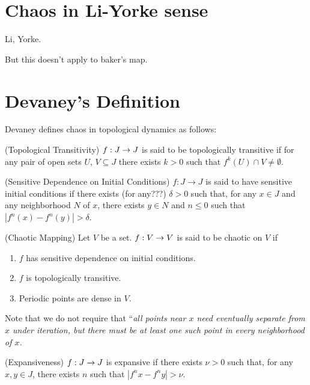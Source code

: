 \documentclass[11pt]{article}
\begin{document}
\section{Chaos in Li-Yorke sense}
\begin{theorem}
  Li, Yorke.
\end{theorem}

But this doesn't apply to baker's map.

\section{Devaney's Definition}
Devaney defines chaos in topological dynamics as follows:

\begin{definition}
  (Topological Transitivity) $f: J \rightarrow J$ is said to be topologically
  transitive if for any pair of open sets $U$, $V \subseteq J$
  there exists $k > 0$ such that $f^k(U) \cap V \neq \emptyset$.
\end{definition}
\begin{definition}
  (Sensitive Dependence on Initial Conditions) $f: J \rightarrow J$ 
  is said to have sensitive initial conditions if there exists (for any???) $\delta > 0$
  such that, for any $x \in J$ and any neighborhood $N$ of $x$,
  there exists $y\in N$ and $n\leq 0$ such that $|f^n(x) - f^n(y)|>\delta$.
\end{definition}

\begin{definition}
  (Chaotic Mapping) Let $V$ be a set. $f: V\rightarrow V$ is said to be chaotic on $V$ if
  \begin{enumerate}
    \item $f$ has sensitive dependence on initial conditions.
    \item $f$ is topologically transitive.
    \item Periodic points are dense in $V$.
  \end{enumerate}
\end{definition}

Note that we do not require that
``\it{all} points near $x$ need eventually separate from $x$
under iteration, but there must be at least one such point in
every neighborhood of $x$.

\begin{definition}
  (Expansiveness) $f: J\rightarrow J$ is expansive if there exists $\nu > 0$
  such that, for any $x,y\in J$, there exists $n$ such that
  $|f^nx-f^ny| > \nu$.
\end{definition}
\end{document}
